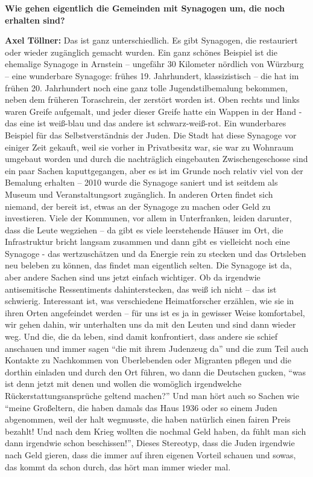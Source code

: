 \textbf{Wie gehen eigentlich die Gemeinden mit Synagogen um, die noch erhalten sind?} 

\textbf{Axel Töllner:} Das ist ganz unterschiedlich. Es gibt Synagogen, die restauriert oder wieder zugänglich gemacht wurden. Ein ganz schönes Beispiel ist die ehemalige Synagoge in Arnstein – ungefähr 30 Kilometer nördlich von Würzburg – eine wunderbare Synagoge: frühes 19. Jahrhundert, klassizistisch – die hat im frühen 20. Jahrhundert noch eine ganz tolle Jugendstilbemalung bekommen, neben dem früheren Toraschrein, der zerstört worden ist. Oben rechts und links waren Greife aufgemalt, und jeder dieser Greife hatte ein Wappen in der Hand - das eine ist weiß-blau und das andere ist schwarz-weiß-rot. Ein wunderbares Beispiel für das Selbstverständnis der Juden. 
Die Stadt hat diese Synagoge vor einiger Zeit gekauft, weil sie vorher in Privatbesitz war, sie war zu Wohnraum umgebaut worden und durch die nachträglich eingebauten Zwischengeschosse sind ein paar Sachen kaputtgegangen, aber es ist im Grunde noch relativ viel von der Bemalung erhalten – 2010 wurde die Synagoge saniert und ist seitdem als Museum und Veranstaltungsort zugänglich.  
In anderen Orten findet sich niemand, der bereit ist, etwas an der Synagoge zu machen oder Geld zu investieren. Viele der Kommunen, vor allem in Unterfranken, leiden darunter, dass die Leute wegziehen – da gibt es viele leerstehende Häuser im Ort, die Infrastruktur bricht langsam zusammen und dann gibt es vielleicht noch eine Synagoge - das wertzuschätzen und da Energie rein zu stecken und das Ortsleben neu beleben zu können, das findet man eigentlich selten. Die Synagoge ist da, aber andere Sachen sind uns jetzt einfach wichtiger. Ob da irgendwie antisemitische Ressentiments dahinterstecken, das weiß ich nicht – das ist schwierig. 
Interessant ist, was verschiedene Heimatforscher erzählen, wie sie in ihren Orten angefeindet werden – für uns ist es ja in gewisser Weise komfortabel, wir gehen dahin, wir unterhalten uns da mit den Leuten und sind dann wieder weg. Und die, die da leben, sind damit konfrontiert, dass andere sie schief anschauen und immer sagen "`die mit ihrem Judenzeug da"' und die zum Teil auch Kontakte zu Nachkommen von Überlebenden oder Migranten pflegen und die dorthin einladen und durch den Ort führen, wo dann die Deutschen gucken, "`was ist denn jetzt mit denen und wollen die womöglich irgendwelche Rückerstattungsansprüche geltend machen?"' 
Und man hört auch so Sachen wie "`meine Großeltern, die haben damals das Haus 1936 oder so einem Juden abgenommen, weil der halt wegmusste, die haben natürlich einen fairen Preis bezahlt! Und nach dem Krieg wollten die nochmal Geld haben, da fühlt man sich dann irgendwie schon beschissen!"', Dieses Stereotyp, dass die Juden irgendwie nach Geld gieren, dass die immer auf ihren eigenen Vorteil schauen und sowas, das kommt da schon durch, das hört man immer wieder mal.  

